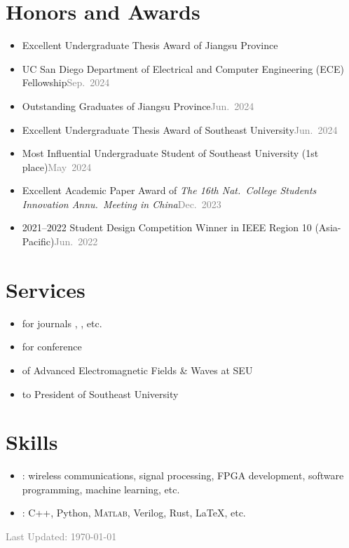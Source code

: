 \documentclass{color-cv}
\begin{document}
\section{Honors and Awards}
\begin{itemize}
  \item Excellent Undergraduate Thesis Award of Jiangsu Province
  \item UC San Diego Department of Electrical and Computer Engineering (ECE) Fellowship\hfill\textcolor{gray}{Sep.~2024}
  \item Outstanding Graduates of Jiangsu Province\hfill\textcolor{gray}{Jun.~2024}
  \item Excellent Undergraduate Thesis Award of Southeast University\hfill\textcolor{gray}{Jun.~2024}
  \item Most Influential Undergraduate Student of Southeast University (1st place)\hfill\textcolor{gray}{May~2024}
  \item Excellent Academic Paper Award of \textit{The 16th Nat.\ College Students Innovation Annu.\ Meeting in China}\hfill\textcolor{gray}{Dec.~2023} %
  \item 2021--2022 Student Design Competition Winner in IEEE Region 10 (Asia-Pacific)\hfill\textcolor{gray}{Jun.~2022}
\end{itemize}

\section{Services}
\begin{itemize}
  \item {} for journals , , etc.
  \item {} for conference 
  \item {} of Advanced Electromagnetic Fields \& Waves at SEU
  \item {} to President of Southeast University
\end{itemize}

\section{Skills}
\begin{itemize}
  \item {}: wireless communications, signal processing, FPGA development, software programming, machine learning, etc.
  \item {}: C++, Python, \textsc{Matlab}, Verilog, Rust, \LaTeX{}, etc.
\end{itemize}

\vfill\noindent\centering\textcolor{gray}{\small Last Updated: \today{}}
\end{document}
